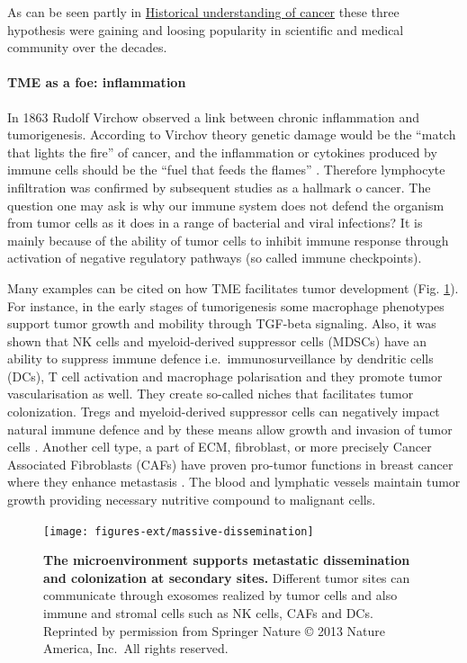 \documentclass[12pt,]{book}
\let\oldparagraph\paragraph
\renewcommand{\paragraph}[1]{\oldparagraph{#1}\mbox{}}
\theoremstyle{definition}
\theoremstyle{definition}
\theoremstyle{definition}
\theoremstyle{remark}
\begin{document}
As can be seen partly in \protect\hyperlink{hist}{Historical
understanding of cancer} these three hypothesis were gaining and loosing
popularity in scientific and medical community over the decades.

\hypertarget{tme-as-a-foe-inflammation}{%
\paragraph{TME as a foe: inflammation}\label{tme-as-a-foe-inflammation}}

In 1863 Rudolf Virchow observed a link between chronic inflammation and
tumorigenesis. According to Virchov theory genetic damage would be the
``match that lights the fire'' of cancer, and the inflammation or
cytokines produced by immune cells should be the ``fuel that feeds the
flames'' \citep{Balkwill2001}. Therefore lymphocyte infiltration was
confirmed by subsequent studies as a hallmark o cancer. The question one
may ask is why our immune system does not defend the organism from tumor
cells as it does in a range of bacterial and viral infections? It is
mainly because of the ability of tumor cells to inhibit immune response
through activation of negative regulatory pathways (so called immune
checkpoints).

Many examples can be cited on how TME facilitates tumor development
(Fig. \ref{fig:met-dis}). For instance, in the early stages of
tumorigenesis some macrophage phenotypes support tumor growth and
mobility through TGF-beta signaling. Also, it was shown that NK cells
and myeloid-derived suppressor cells (MDSCs) have an ability to suppress
immune defence i.e.~immunosurveillance by dendritic cells (DCs), T cell
activation and macrophage polarisation and they promote tumor
vascularisation as well. \citep{Talmadge2013, Gabrilovich2012} They
create so-called niches that facilitates tumor colonization. Tregs and
myeloid-derived suppressor cells can negatively impact natural immune
defence and by these means allow growth and invasion of tumor cells
\citep{Taube2017a}. Another cell type, a part of ECM, fibroblast, or
more precisely Cancer Associated Fibroblasts (CAFs) have proven
pro-tumor functions in breast cancer where they enhance metastasis
\citep{Dumont2013}. The blood and lymphatic vessels maintain tumor
growth providing necessary nutritive compound to malignant cells.

\begin{figure}

{\centering \texttt{[image: figures-ext/massive-dissemination]} 

}

\caption{\textbf{The microenvironment supports metastatic
dissemination and colonization at secondary sites.} Different tumor
sites can communicate through exosomes realized by tumor cells and also
immune and stromal cells such as NK cells, CAFs and DCs. Reprinted by
permission from Springer Nature \citep{Quail2013} © 2013 Nature America,
Inc.~All rights reserved.}\label{fig:met-dis}
\end{figure}
\end{document}
